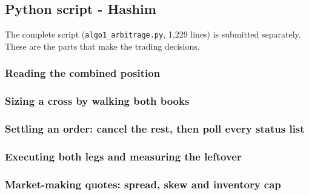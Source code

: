
\subsection{Python script - Hashim}

The complete script (\texttt{algo1\_arbitrage.py}, 1{,}229 lines) is submitted
separately. These are the parts that make the trading decisions.

\subsubsection*{Reading the combined position}


\subsubsection*{Sizing a cross by walking both books}


\subsubsection*{Settling an order: cancel the rest, then poll every status list}


\subsubsection*{Executing both legs and measuring the leftover}


\subsubsection*{Market-making quotes: spread, skew and inventory cap}

